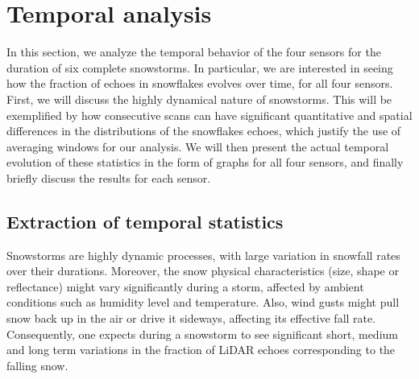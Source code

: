 



\section{Temporal analysis}
\label{sec:temporal}

In this section, we analyze the temporal behavior of the four sensors for the duration of six complete snowstorms. In particular, we are interested in seeing how the fraction of echoes in snowflakes evolves over time, for all four sensors. First, we will discuss the highly dynamical nature of snowstorms. This will be exemplified by how consecutive scans can have significant quantitative and spatial differences in the distributions of the snowflakes echoes, which justify the use of averaging windows for our analysis. We will then present the actual temporal evolution of these statistics in the form of graphs for all four sensors, and finally briefly discuss the results for each sensor.

\subsection{Extraction of temporal statistics}

Snowstorms are highly dynamic processes, with large variation in snowfall rates over their durations. Moreover, the snow physical characteristics (size, shape or reflectance) might vary significantly during a storm, affected by ambient conditions such as humidity level and temperature. Also, wind gusts might pull snow back up in the air or drive it sideways, affecting its effective fall rate. Consequently, one expects during a snowstorm to see significant short, medium and long term variations in the fraction of LiDAR echoes corresponding to the falling snow. 

